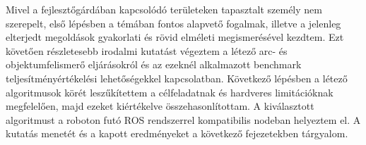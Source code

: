Mivel a fejlesztőgárdában kapcsolódó területeken tapasztalt személy nem szerepelt, első lépésben a témában fontos alapvető fogalmak, illetve a jelenleg elterjedt megoldások gyakorlati és rövid elméleti megismerésével kezdtem. Ezt követően részletesebb irodalmi kutatást végeztem a létező arc- és objektumfelismerő eljárásokról és az ezeknél alkalmazott benchmark teljesítményértékelési lehetőségekkel kapcsolatban. Következő lépésben a létező algoritmusok körét leszűkítettem a célfeladatnak és hardveres limitációknak megfelelően, majd ezeket kiértékelve összehasonlítottam. A kiválasztott algoritmust a roboton futó ROS rendszerrel kompatibilis nodeban helyeztem el. A kutatás menetét és a kapott eredményeket a következő fejezetekben tárgyalom.
